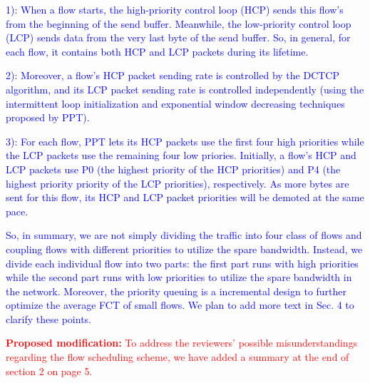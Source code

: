 \documentclass[12pt,one-column]{article}
\begin{document}
\textcolor{blue}{1): When a flow starts, the high-priority control loop (HCP) sends this flow's from the beginning of the send buffer. Meanwhile, the low-priority control loop (LCP) sends data from the very last byte of the send buffer. So, in general, for each flow, it contains both HCP and LCP packets during its lifetime. }

\textcolor{blue}{2): Moreover, a flow's HCP packet sending rate is controlled by the DCTCP algorithm, and its LCP packet sending rate is controlled independently (using the intermittent loop initialization and exponential window decreasing techniques proposed by PPT). 
}

\textcolor{blue}{3): For each flow, PPT lets its HCP packets use the first four high priorities while the LCP packets use the remaining four low priories. Initially, a flow's HCP and LCP packets use  P0 (the highest priority of the HCP priorities) and P4 (the highest priority priority of the LCP priorities), respectively. As more bytes are sent for this flow, its HCP and LCP packet priorities will be demoted at the same pace.
}

\textcolor{blue}{So, in summary, we are not simply dividing the traffic into four class of flows and coupling flows with different priorities to utilize the spare bandwidth. Instead, we divide each individual flow into two parts: the first part runs with high priorities while the second part runs with low priorities to utilize the spare bandwidth in the network. Moreover, the priority queuing is a incremental design to further optimize the average FCT of small flows. We plan to add more text in Sec. 4 to clarify these points.
}

\noindent\textcolor{red}{\textbf{Proposed modification: }
To address the reviewers' possible misunderstandings regarding the flow scheduling scheme, we have added a summary at the end of section 2 on page 5.
}

\end{document}
